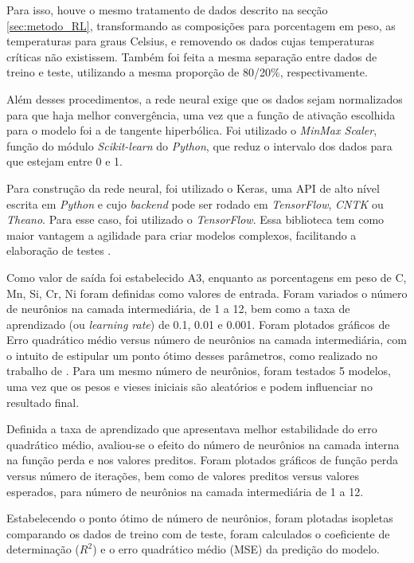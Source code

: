 \documentclass[brazil,tf,epusp]{usp}  %
\begin{document}
Para isso, houve o mesmo tratamento de dados descrito na secção \ref{sec:metodo_RL}, transformando as composições para porcentagem em peso, as temperaturas para graus Celsius, e removendo os dados cujas temperaturas críticas não existissem. Também foi feita a mesma separação entre dados de treino e teste, utilizando a mesma proporção de 80/20\%, respectivamente.

Além desses procedimentos, a rede neural exige que os dados sejam normalizados para que haja melhor convergência, uma vez que a função de ativação escolhida para o modelo foi a de tangente hiperbólica. Foi utilizado o \textit{MinMax Scaler}, função do módulo \textit{Scikit-learn} do \textit{Python}, que reduz o intervalo dos dados para que estejam entre 0 e 1.

Para construção da rede neural, foi utilizado o Keras, uma API de alto nível escrita em \textit{Python} e cujo
\textit{backend} pode ser rodado em \textit{TensorFlow}, \textit{CNTK} ou \textit{Theano}. Para esse caso, foi utilizado o \textit{TensorFlow}. Essa biblioteca tem como maior vantagem a agilidade para criar modelos complexos, facilitando a elaboração de testes \cite{Skalski2017}.

Como valor de saída foi estabelecido A3, enquanto as porcentagens em peso de C, Mn, Si, Cr, Ni foram definidas como valores de entrada. Foram variados o número de neurônios na camada intermediária, de 1 a 12, bem como a taxa de aprendizado (ou \textit{learning rate}) de 0.1, 0.01 e 0.001. Foram plotados gráficos de Erro quadrático médio versus número de neurônios na camada intermediária, com o intuito de estipular um ponto ótimo desses parâmetros, como realizado no trabalho de . Para um mesmo número de neurônios, foram testados 5 modelos, uma vez que os pesos e vieses iniciais são aleatórios e podem influenciar no resultado final.

Definida a taxa de aprendizado que apresentava melhor estabilidade do erro quadrático médio, avaliou-se o efeito do número de neurônios na camada interna na função perda e nos valores preditos. Foram plotados gráficos de função perda versus número de iterações, bem como de valores preditos versus valores esperados, para número de neurônios na camada intermediária de 1 a 12.

Estabelecendo o ponto ótimo de número de neurônios, foram plotadas isopletas comparando os dados de treino com de teste, foram calculados o coeficiente de determinação ($R^{2}$) e o erro quadrático médio (MSE) da predição do modelo.
\end{document}
